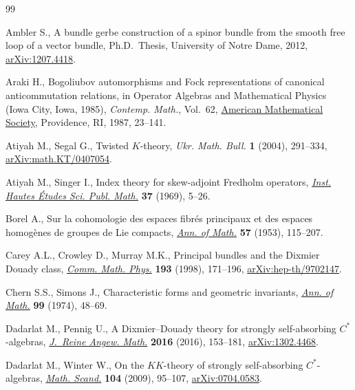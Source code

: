 \documentclass[10pt,a4paper]{amsart}
\numberwithin{equation}{section}
\begin{document}

\begin{thebibliography}{99}
\footnotesize\itemsep=0pt

Ambler S., A bundle gerbe construction of a spinor bundle from the smooth free
 loop of a vector bundle, Ph.D.~Thesis, {U}niversity of {N}otre {D}ame, 2012,
 \href{https://arxiv.org/abs/1207.4418}{arXiv:1207.4418}.

Araki H., Bogoliubov automorphisms and {F}ock representations of canonical
 anticommutation relations, in Operator {A}lgebras and {M}athematical
 {P}hysics ({I}owa {C}ity, {I}owa, 1985), \textit{Contemp. Math.}, Vol.~62,
  \href{https://doi.org/10.1090/conm/062/878376}{American Mathematical Society}, Providence, RI, 1987, 23--141.

Atiyah M., Segal G., Twisted {$K$}-theory, \textit{Ukr. Math. Bull.} \textbf{1}
 (2004), 291--334, \href{https://arxiv.org/abs/math.KT/0407054}{arXiv:math.KT/0407054}.

Atiyah M., Singer I., Index theory for skew-adjoint {F}redholm operators,
  \href{https://doi.org/10.1007/BF02684885}{\textit{Inst. Hautes \'Etudes Sci. Publ. Math.}} \textbf{37} (1969), 5--26.

Borel A., Sur la cohomologie des espaces fibr\'es principaux et des espaces
 homog\`enes de groupes de {L}ie compacts, \href{https://doi.org/10.2307/1969728}{\textit{Ann. of Math.}} \textbf{57}
 (1953), 115--207.

Carey A.L., Crowley D., Murray M.K., Principal bundles and the {D}ixmier
 {D}ouady class, \href{https://doi.org/10.1007/s002200050323}{\textit{Comm. Math. Phys.}} \textbf{193} (1998), 171--196,
 \href{https://arxiv.org/abs/hep-th/9702147}{arXiv:hep-th/9702147}.

Chern S.S., Simons J., Characteristic forms and geometric invariants,
 \href{https://doi.org/10.2307/1971013}{\textit{Ann. of Math.}} \textbf{99} (1974), 48--69.

Dadarlat M., Pennig U., A {D}ixmier--{D}ouady theory for strongly
 self-absorbing {$C^*$}-algebras,  \href{https://doi.org/10.1515/crelle-2014-0044}{\textit{J.~Reine Angew. Math.}} \textbf{2016}
 (2016), 153--181, \href{https://arxiv.org/abs/1302.4468}{arXiv:1302.4468}.

Dadarlat M., Winter W., On the {$KK$}-theory of strongly self-absorbing
 {$C^*$}-algebras,  \href{https://doi.org/10.7146/math.scand.a-15086}{\textit{Math. Scand.}} \textbf{104} (2009), 95--107,
 \href{https://arxiv.org/abs/0704.0583}{arXiv:0704.0583}.


\end{thebibliography}
\end{document}
